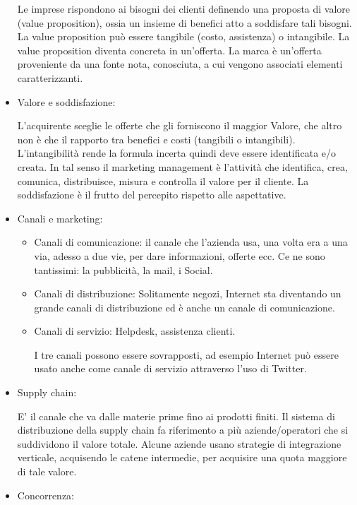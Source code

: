 \documentclass[11pt]{article}
\begin{document}
\begin{itemize}[topsep=0ex]
	Le imprese rispondono ai bisogni dei clienti definendo una proposta di valore (value proposition), ossia un insieme di benefici atto a soddisfare tali bisogni. La value proposition può essere tangibile (costo, assistenza) o intangibile. La value proposition diventa concreta in un'offerta. La marca è un'offerta proveniente da una fonte nota, conosciuta, a cui vengono associati elementi caratterizzanti.
	\item Valore e soddisfazione:
	
	L'acquirente sceglie le offerte che gli forniscono il maggior Valore, che altro non è che il rapporto tra benefici e costi (tangibili o intangibili). L'intangibilità rende la formula incerta quindi deve essere identificata e/o creata. \newline
	In tal senso il marketing management è l'attività che identifica, crea, comunica, distribuisce, misura e controlla il valore per il cliente.\newline
	La soddisfazione è il frutto del percepito rispetto alle aspettative.
	\item Canali e marketing:
	\begin{itemize}[noitemsep,topsep=0ex]
		\item Canali di comunicazione: il canale che l'azienda usa, una volta era a una via, adesso a due vie, per dare informazioni, offerte ecc. Ce ne sono tantissimi: la pubblicità, la mail, i Social.
		\item Canali di distribuzione: Solitamente negozi, Internet sta diventando un grande canali di distribuzione ed è anche un canale di comunicazione.
		\item Canali di servizio: Helpdesk, assistenza clienti.
		
		I tre canali possono essere sovrapposti, ad esempio Internet può essere usato anche come canale di servizio attraverso l'uso di Twitter.
	\end{itemize}
	\item Supply chain:
	
	E' il canale che va dalle materie prime fino ai prodotti finiti. 
	Il sistema di distribuzione della supply chain fa riferimento a più aziende/operatori che si suddividono il valore totale.
	Alcune aziende usano strategie di integrazione verticale, acquisendo le catene intermedie, per acquisire una quota maggiore di tale valore.
	\item Concorrenza:
	

\end{itemize}
\end{document}

